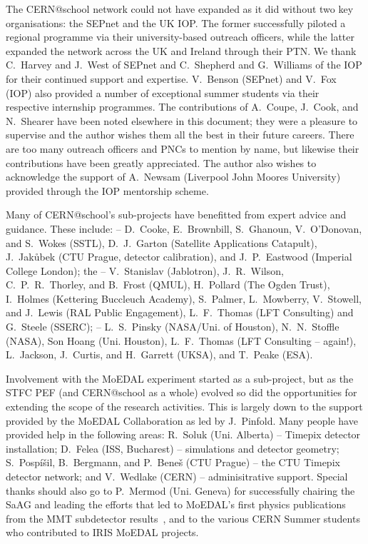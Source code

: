 The CERN@school network could not have expanded as it did without
two key organisations: the \acf{SEPnet} and the UK \acf{IOP}.
The former successfully piloted a regional programme via
their university-based outreach officers, while the latter
expanded the network across the UK and Ireland through their
\acf{PTN}.
We thank
C.~Harvey
and
J.~West
of \acs{SEPnet}
and
C.~Shepherd
and
G.~Williams
of the \acs{IOP}
for their continued support and expertise.
V.~Benson (\acs{SEPnet})
and
V.~Fox (\acs{IOP})
also provided a number of exceptional summer students via their
respective internship programmes.
The contributions of A.~Coupe, J.~Cook, and N.~Shearer
have been noted elsewhere in this document;
they were a pleasure to supervise and the author wishes them
all the best in their future careers.
%
There are too many outreach officers and \acfp{PNC}
to mention by name, but likewise their contributions have been
greatly appreciated.
%
The author also wishes to acknowledge the support of
A.~Newsam (Liverpool John Moores University)
provided through the \acs{IOP} mentorship scheme.

Many of CERN@school's sub-projects have benefitted
from expert advice and guidance. These include:
 -- D.~Cooke, E.~Brownbill, S.~Ghanoun,
V.~O'Donovan, and S.~Wokes (\acs{SSTL}),
D.~J.~Garton (Satellite Applications Catapult),
J.~Jak\r{u}bek (\acs{CTU} Prague, detector calibration),
and J.~P.~Eastwood (Imperial College London);
the  -- V.~Stanislav (Jablotron),
J.~R.~Wilson, C.~P.~R.~Thorley, and B.~Frost (\acs{QMUL}),
H.~Pollard (The Ogden Trust),
I.~Holmes (Kettering Buccleuch Academy),
S.~Palmer, L.~Mowberry, V.~Stowell, and J.~Lewis (\acs{RAL} Public Engagement),
L.~F.~Thomas (LFT Consulting) and G.~Steele (\acs{SSERC});
 -- L.~S.~Pinsky (\acs{NASA}/Uni. of Houston),
N.~N.~Stoffle (\acs{NASA}), Son Hoang (Uni. Houston),
L.~F.~Thomas (LFT Consulting -- again!),
L.~Jackson, J.~Curtis, and H.~Garrett (\acs{UKSA}),
and T.~Peake (\acs{ESA}).

Involvement with the \acs{MoEDAL} experiment started as a sub-project,
but as the \acs{STFC} \acs{PEF} (and CERN@school as a whole) evolved
so did the opportunities for extending the scope of the research activities.
This is largely down to the support provided by the \acs{MoEDAL}
Collaboration as led by J.~Pinfold.
Many people have provided help in the following areas:
R.~Soluk (Uni. Alberta) -- Timepix detector installation;
D.~Felea (ISS, Bucharest) -- simulations and detector geometry;
S.~Posp\'{i}\v{s}il, B.~Bergmann, and P.~Bene\v{s} (\acs{CTU} Prague) -- the
\acs{CTU} Timepix detector network;
and
V.~Wedlake (\acs{CERN}) -- adminisitrative support.
Special thanks should also go to
P.~Mermod (Uni. Geneva) for successfully chairing the
\acl{SaAG} and leading the efforts that
led to \acs{MoEDAL}'s first physics publications from the
\acs{MMT} subdetector results~\cite{MoEDAL2016a,MoEDAL2017a},
and to the various CERN Summer students who contributed
to \acs{IRIS} \acs{MoEDAL} projects.

